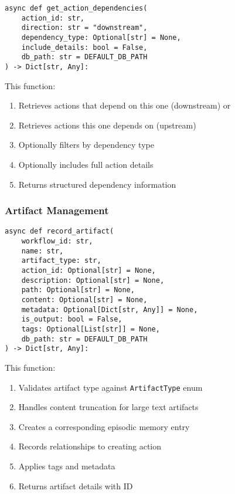 \documentclass[12pt,a4paper]{article}
\newcommand{\code}[1]{\texttt{#1}}
\begin{document}
\begin{pageablecode}
\begin{verbatim}
async def get_action_dependencies(
    action_id: str,
    direction: str = "downstream",
    dependency_type: Optional[str] = None,
    include_details: bool = False,
    db_path: str = DEFAULT_DB_PATH
) -> Dict[str, Any]:
\end{verbatim}
\end{pageablecode}
This function:
\begin{enumerate}[label=\arabic*.]
    \item Retrieves actions that depend on this one (downstream) or
    \item Retrieves actions this one depends on (upstream)
    \item Optionally filters by dependency type
    \item Optionally includes full action details
    \item Returns structured dependency information
\end{enumerate}

\subsubsection*{Artifact Management}
\begin{pageablecode}
\begin{verbatim}
async def record_artifact(
    workflow_id: str,
    name: str,
    artifact_type: str,
    action_id: Optional[str] = None,
    description: Optional[str] = None,
    path: Optional[str] = None,
    content: Optional[str] = None,
    metadata: Optional[Dict[str, Any]] = None,
    is_output: bool = False,
    tags: Optional[List[str]] = None,
    db_path: str = DEFAULT_DB_PATH
) -> Dict[str, Any]:
\end{verbatim}
\end{pageablecode}
This function:
\begin{enumerate}[label=\arabic*.]
    \item Validates artifact type against \code{ArtifactType} enum
    \item Handles content truncation for large text artifacts
    \item Creates a corresponding episodic memory entry
    \item Records relationships to creating action
    \item Applies tags and metadata
    \item Returns artifact details with ID
\end{enumerate}
\end{document}
